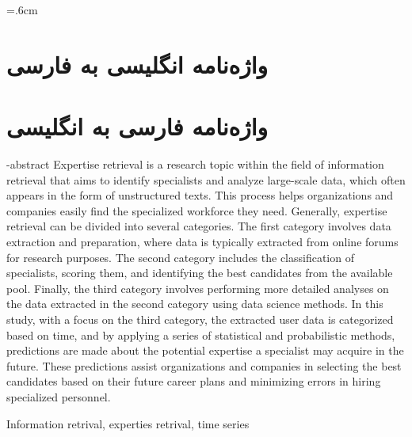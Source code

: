 \documentclass[oneside,openany,msc]{SBU-Thesis}
\begin{document}
	
\firstPage %
\davaranPage %

\rightsPage %
\copyRightPage %

\abstractPage %


\tableofcontents %
\listoffigures \newpage %
\listoftables \newpage %

		




	

\newpage



\baselineskip=.6cm

\chapter*{واژه‌نامه  انگلیسی به  فارسی}
\noindent
{}


\chapter*{واژه‌نامه فارسی به انگلیسی}
\noindent
{}

\baselineskip=1cm


\en-abstract
{
	Expertise retrieval is a research topic within the field of information retrieval that aims to identify specialists and analyze large-scale data, which often appears in the form of unstructured texts. This process helps organizations and companies easily find the specialized workforce they need. Generally, expertise retrieval can be divided into several categories. The first category involves data extraction and preparation, where data is typically extracted from online forums for research purposes. The second category includes the classification of specialists, scoring them, and identifying the best candidates from the available pool. Finally, the third category involves performing more detailed analyses on the data extracted in the second category using data science methods. In this study, with a focus on the third category, the extracted user data is categorized based on time, and by applying a series of statistical and probabilistic methods, predictions are made about the potential expertise a specialist may acquire in the future. These predictions assist organizations and companies in selecting the best candidates based on their future career plans and minimizing errors in hiring specialized personnel.
}

\latinkeywords
{
	Information retrival, experties retrival, time series
}

\latinAbstractPage %
\latinFirstPage %

	
\end{document}
